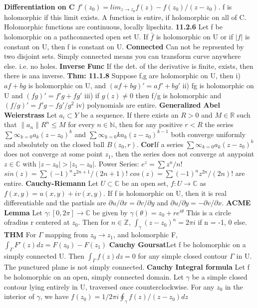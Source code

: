 \documentclass[8pt]{extarticle}
\theoremstyle{definition}
\begin{document}
\textbf{Differentiation on C} $f'(z_0) = lim_{z \to z_0} f(z)- f(z_0)/(z-z_0)$. f is holomorphic if this limit exists. A function is entire, if holomorphic on all of C. Holomorphic functions are continuous, locally lipschitz. 
\textbf{11.2.6} Let f be holomorphic on a pathconnected open set U. If $\bar f$ is holomorphic on U or if $|f|$ is constant on U, then f is constant on U.
\textbf{Connected} Can not be reprsented by two disjoint sets. Simply connected means you can transform curve anywhere else. i.e. no holes.
\textbf{Inverse Func} If the det. of the derivative is finite, exists, then there is ana inverse. 
\textbf{Thm: 11.1.8} Suppose f,g are holomorphic on U, then i) $af + bg$ is holomorphic on U, and $(af + bg)' = af' + bg'$ ii) fg is holomorphic on U and $(fg)' = f'g +f g'$ iii) if $g(z) \neq 0$ then f/g is holomorphic and $(f/g)' = f'g - fg'/g^2$ iv) polynomials are entire. 
\textbf{Generalized Abel Weierstrass} Let ${a_i} \subset Y$ be a sequence. If there exists an $R>0$ and $M \in \mathbb{R}$ such that $\|a_n\|R^n \leq M$ for every $n\in \mathbb{N}$, then for any positive $r<R$ the series $\sum \infty_{k=0} a_k(z-z_0)^k$ and $\sum \infty_{k=0} k a_k(z-z_0)^{k-1}$ both converge uniformly and absolutely on the closed ball $B(z_0,r)$.
\textbf{Cor}If a series $\sum \infty_{k=0} a_k(z-z_0)^k$ does not converge at some point $z_1$, then the series does not converge at anypoint $z \in \mathbb{C}$ with $|z-z_0|>|z_1-z_0|$. 
Power Series: $e^z = \sum z^n/n! $ $sin(z) = \sum (-1)^n z^{2n+1}/(2n+1)!$ $cos(z) = \sum (-1)^n z^{2n}/(2n)!$  are entire.
\textbf{Cauchy-Riemann} Let $U \subset \mathbb{C} $ be an open set, $f:U \to \mathbb{C}$ as $f(x,y) = u(x,y) + iv(x,y)$. If f is holomorphic on U, then it is real differentiable and the partials are $\partial u/ \partial x = \partial v/ \partial y$ and $\partial u /\partial y = - \partial v/ \partial x$. 
\textbf{ACME Lemma} Let $\gamma : [0,2\pi] \to \mathbb{C}$ be given by $\gamma(\theta) = z_0 + re^{i\theta}$ This is a circle ofradius r centered at $z_0$. Then for $n \in \mathbb{Z}$, $\int_\gamma(z-z_0)^n =  2\pi i$ if n = -1, 0 else. 
\textbf{THM} For $\Gamma$ mapping from $z_0 \to z_1$, and holomorphic F, $\int_\Gamma F'(z)dz = F(z_0)-F(z_1)$
\textbf{Cauchy Goursat}Let f be holomorphic on a simply connected U. Then $\int _\Gamma f(z)dz = 0$ for any simple closed contour $\Gamma$ in U.
The punctured plane is not simply connected.
\textbf{Cauchy Integral formula} Let f be holomorphic on an open, simply connected domain. Let $\gamma$ be a simple closed contour lying entirely in U, traversed once counterclockwise. For any $z_0$ in the interior of $\gamma$, we have $f(z_0) = 1/2\pi i \oint_\gamma f(z)/(z-z_0) dz$
\end{document}
